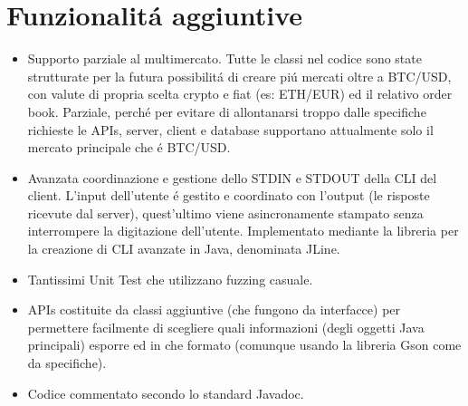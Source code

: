 \chapter{Funzionalit\'a aggiuntive}

\begin{itemize}
    \item Supporto parziale al multimercato. Tutte le classi nel codice sono state strutturate per la futura possibilit\'a di creare pi\'u mercati oltre a BTC/USD, con valute di propria scelta crypto e fiat (es: ETH/EUR) ed il relativo order book. Parziale, perch\'e per evitare di allontanarsi troppo dalle specifiche richieste le APIs, server, client e database supportano attualmente solo il mercato principale che \'e BTC/USD.
    \item Avanzata coordinazione e gestione dello STDIN e STDOUT della CLI del client. L'input dell'utente \'e gestito e coordinato con l'output (le risposte ricevute dal server), quest'ultimo viene asincronamente stampato senza interrompere la digitazione dell'utente. Implementato mediante la libreria per la creazione di CLI avanzate in Java, denominata JLine.
    \item Tantissimi Unit Test che utilizzano fuzzing casuale.
    \item APIs costituite da classi aggiuntive (che fungono da interfacce) per permettere facilmente di scegliere quali informazioni (degli oggetti Java principali) esporre ed in che formato (comunque usando la libreria Gson come da specifiche).
    \item Codice commentato secondo lo standard Javadoc.
\end{itemize}
